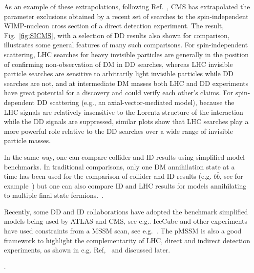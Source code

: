 As an example of these extrapolations, following Ref.~\cite{Boveia:2016mrp}, CMS has extrapolated the parameter exclusions obtained by a recent set of searches to the spin-independent WIMP-nucleon cross section of a direct detection experiment. The result, Fig.~\ref{fig:SICMS}, with a selection of DD results also shown for comparison, illustrates some general features of many such comparisons. For spin-independent scattering, LHC searches for heavy invisible particles are generally in the position of confirming non-observation of DM in DD searches, whereas LHC invisible particle searches are sensitive to arbitrarily light invisible particles while DD searches are not, and at intermediate DM masses both LHC and DD experiments have great potential for a discovery and could verify each other's claims. For spin-dependent DD scattering (e.g., an axial-vector-mediated model), because the LHC signals are relatively insensitive to the Lorentz structure of the interaction while the DD signals are suppressed, similar plots show that LHC searches play a more powerful role relative to the DD searches over a wide range of invisible particle masses. 

In the same way, one can compare collider and ID results using simplified model benchmarks. In traditional comparisons, only one DM annihilation state at a time has been used for the comparison of collider and ID results (e.g. $b\bar{b}$, see for example~\cite{Agrawal:2014una}) but one can also compare ID and LHC results for models annihilating to multiple final state fermions.~\cite{Carpenter:2016thc}.

Recently, some DD and ID collaborations have adopted the benchmark simplified models being used by ATLAS and CMS, see e.g.\cite{PhysRevLett.118.251301,Balazs:2017hxh}. IceCube and other experiments have used constraints from a MSSM scan, see e.g.~\cite{Aartsen:2016zhm}. The pMSSM is also a good framework to highlight the complementarity of LHC, direct and indirect detection experiments, as shown in e.g. Ref,~\cite{Cahill-Rowley:2014twa} and discussed later. %


\begin{marginnote}[]
\end{marginnote}. 

